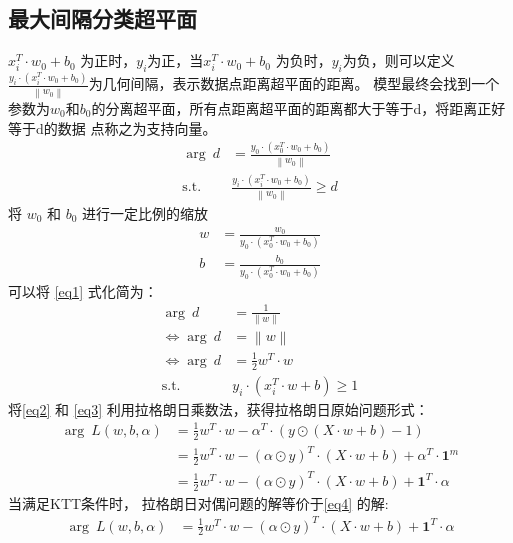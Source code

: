 \documentclass[12pt, a4paper, oneside]{ctexart}
\begin{document}
\subsection{最大间隔分类超平面}
$x_i^T \cdot w_0 + b_0$ 为正时，$y_i$为正，当$x_i^T \cdot w_0 + b_0$ 为负时，$y_i$为负，则可以定义
$\frac{y_i \cdot (x_i^T \cdot w_0 + b_0)}{ \left\|w_0\right\|}$为几何间隔，表示数据点距离超平面的距离。
模型最终会找到一个参数为$w_0$和$b_0$的分离超平面，所有点距离超平面的距离都大于等于d，将距离正好等于d的数据
点称之为支持向量。
\begin{align}
    \mathop{\arg\max_{w_0, b_0}} \ d &= \frac{y_0 \cdot (x_0^T \cdot w_0 + b_0)}{ \left\|w_0\right\|} 			\label{eq1}\\
	\mathrm{ s.t. }\ \   &\frac{y_i \cdot (x_i^T \cdot w_0 + b_0)}{ \left\|w_0\right\|} \geq d				\nonumber
\end{align}
将 $w_0$ 和 $b_0$ 进行一定比例的缩放
\begin{align}
	w &= \frac{w_0 }{ y_0 \cdot (x_0^T \cdot w_0 + b_0)} 			\nonumber\\
    b &= \frac{b_0 }{ y_0 \cdot (x_0^T \cdot w_0 + b_0)} 			\nonumber
\end{align}
可以将 \eqref{eq1} 式化简为：
\begin{align}
	\mathop{\arg\max_{w}} \ d &= \frac{1}{ \left\|w\right\|} 			\nonumber\\
    \Leftrightarrow   \mathop{\arg\min_{w}}  \ d &=  \left\|w\right\| \nonumber\\
    \Leftrightarrow   \mathop{\arg\min_{w}}  \ d &=  \frac{1}{2}w^T \cdot w \label{eq2}\\
    \mathrm{ s.t. }\ \   & y_i \cdot (x_i^T \cdot w + b) \geq 1				\label{eq3}
\end{align}
将\eqref{eq2} 和 \eqref{eq3} 利用拉格朗日乘数法，获得拉格朗日原始问题形式：
\begin{align}
    \mathop{\arg\min_{w,b}\max_{\alpha}} \ 	L(w, b, {\alpha}) &= \frac{1}{2}	w^T \cdot w  - {\alpha} ^T \cdot  (y \odot (X \cdot w + b) - 1) \nonumber\\
        &= \frac{1}{2}	w^T \cdot w  - (\alpha \odot y) ^T \cdot  (X \cdot w + b) + \alpha^T \cdot \boldsymbol{1}^m \nonumber\\
        &= \frac{1}{2}	w^T \cdot w  - (\alpha \odot y) ^T \cdot  (X \cdot w + b) + \boldsymbol{1}^T\cdot\alpha \label{eq4}
\end{align}
当满足KTT条件时， 拉格朗日对偶问题的解等价于\eqref{eq4} 的解:
\begin{align}
    \mathop{\arg\max_{\alpha}\min_{w,b}} \ 	L(w, b, {\alpha}) &= \frac{1}{2}	w^T \cdot w  - (\alpha \odot y) ^T \cdot  (X \cdot w + b) + \boldsymbol{1}^T\cdot\alpha \label{eq5}
\end{align}
\end{document}
